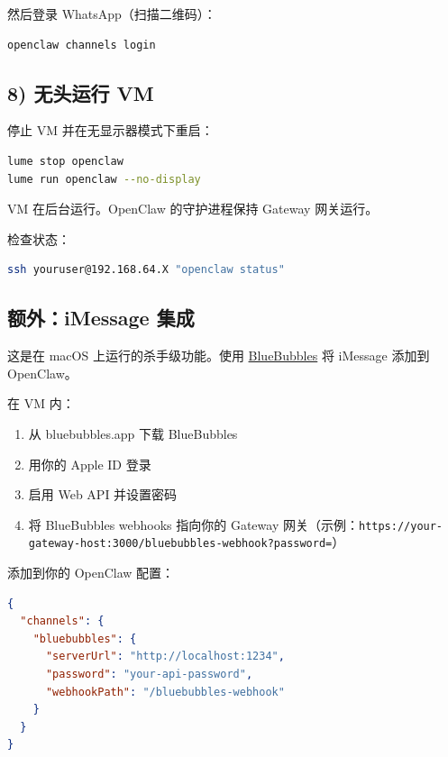 然后登录 WhatsApp（扫描二维码）：

\begin{lstlisting}[language=bash]
openclaw channels login
\end{lstlisting}


\hrulefill


\subsection{8) 无头运行 VM}


停止 VM 并在无显示器模式下重启：

\begin{lstlisting}[language=bash]
lume stop openclaw
lume run openclaw --no-display
\end{lstlisting}


VM 在后台运行。OpenClaw 的守护进程保持 Gateway 网关运行。

检查状态：

\begin{lstlisting}[language=bash]
ssh youruser@192.168.64.X "openclaw status"
\end{lstlisting}


\hrulefill


\subsection{额外：iMessage 集成}


这是在 macOS 上运行的杀手级功能。使用 \href{https://bluebubbles.app}{BlueBubbles} 将 iMessage 添加到 OpenClaw。

在 VM 内：

\begin{enumerate}
  \item 从 bluebubbles.app 下载 BlueBubbles
  \item 用你的 Apple ID 登录
  \item 启用 Web API 并设置密码
  \item 将 BlueBubbles webhooks 指向你的 Gateway 网关（示例：\texttt{https://your-gateway-host:3000/bluebubbles-webhook?password=}）
\end{enumerate}


添加到你的 OpenClaw 配置：

\begin{lstlisting}[language=json]
{
  "channels": {
    "bluebubbles": {
      "serverUrl": "http://localhost:1234",
      "password": "your-api-password",
      "webhookPath": "/bluebubbles-webhook"
    }
  }
}
\end{lstlisting}


